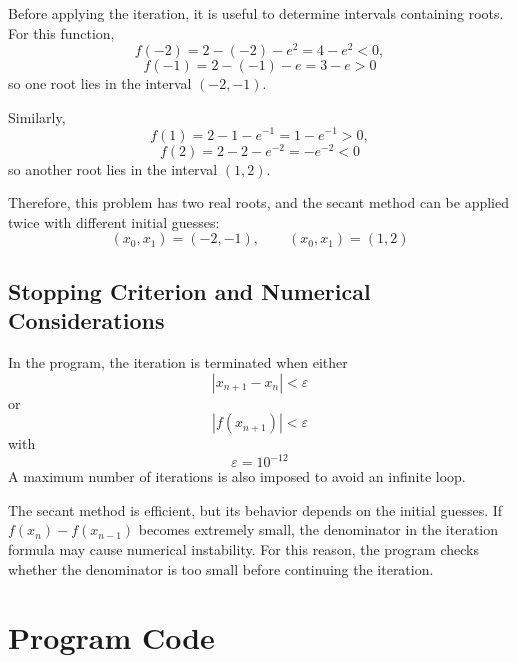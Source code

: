 \documentclass[12pt,a4paper]{article}
\begin{document}
Before applying the iteration, it is useful to determine intervals containing roots. For this function,
\[
f(-2)=2-(-2)-e^2=4-e^2<0,
\]
\[
f(-1)=2-(-1)-e=3-e>0
\]
so one root lies in the interval $(-2,-1)$.

Similarly,
\[
f(1)=2-1-e^{-1}=1-e^{-1}>0,
\]
\[
f(2)=2-2-e^{-2}=-e^{-2}<0
\]
so another root lies in the interval $(1,2)$.

Therefore, this problem has two real roots, and the secant method can be applied twice with different initial guesses:
\[
(x_0,x_1)=(-2,-1),\qquad (x_0,x_1)=(1,2)
\]

\subsection*{Stopping Criterion and Numerical Considerations}

In the program, the iteration is terminated when either
\[
|x_{n+1}-x_n|<\varepsilon
\]
or
\[
|f(x_{n+1})|<\varepsilon
\]
with
\[
\varepsilon=10^{-12}
\]
A maximum number of iterations is also imposed to avoid an infinite loop.

The secant method is efficient, but its behavior depends on the initial guesses. If $f(x_n)-f(x_{n-1})$ becomes extremely small, the denominator in the iteration formula may cause numerical instability. For this reason, the program checks whether the denominator is too small before continuing the iteration.

\section{Program Code}
\end{document}
